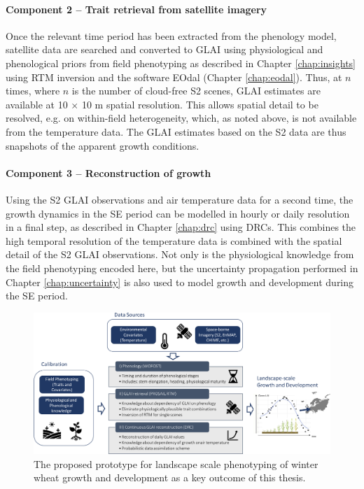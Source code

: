 \paragraph{Component 2 -- Trait retrieval from satellite imagery}
Once the relevant time period has been extracted from the phenology model, satellite data are searched and converted to \gls{GLAI} using physiological and phenological priors from field phenotyping as described in Chapter \ref{chap:insights} using RTM inversion and the software \gls{EOdal} (Chapter \ref{chap:eodal}). Thus, at $n$ times, where $n$ is the number of cloud-free \gls{S2} scenes, \gls{GLAI} estimates are available at 10 $\times$ 10 m spatial resolution. This allows spatial detail to be resolved, e.g. on within-field heterogeneity, which, as noted above, is not available from the temperature data. The \gls{GLAI} estimates based on the \gls{S2} data are thus snapshots of the apparent growth conditions.

\paragraph{Component 3 -- Reconstruction of growth}
Using the \gls{S2} \gls{GLAI} observations and air temperature data for a second time, the growth dynamics in the \gls{SE} period can be modelled in hourly or daily resolution in a final step, as described in Chapter \ref{chap:drc} using \gls{DRC}s. This combines the high temporal resolution of the temperature data is combined with the spatial detail of the \gls{S2} \gls{GLAI} observations. Not only is the physiological knowledge from the field phenotyping encoded here, but the uncertainty propagation performed in Chapter \ref{chap:uncertainty} is also used to model growth and development during the \gls{SE} period.

\begin{figure}[H]
    \centering
    \includegraphics[width=\textwidth]{07-Discussion/img/prototype.jpg}
    \caption{The proposed prototype for landscape scale phenotyping of winter wheat growth and development as a key outcome of this thesis.}
    \label{fig:oa-disc-prototype}
\end{figure}

